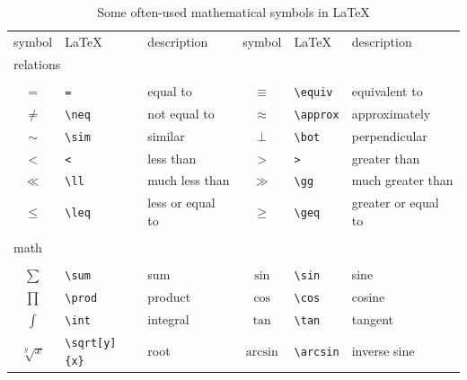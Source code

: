 \label{ch:mathsymbols}

\begin{table}[ht!]\centering\small
\caption{Some often-used mathematical symbols in \LaTeX}\label{tab:mathsymbols}
    \begin{tabular}{cll|cll}
        \toprule
        symbol	        &	 \LaTeX  	        &	 description 	    &	symbol	            &	 \LaTeX  	&	 description\\[+2ex]	
        \multicolumn{2}{l}{relations}			&		                &		                &		                    &		                \\\\
        $=$	            &	\verb|=|	        &	equal to	        &	$\equiv$	        &	\verb|\equiv|	        &	equivalent to	    \\
        $\neq$	        &	\verb|\neq|	        &	not equal to    	&	$\approx$	        &	\verb|\approx|	        &	approximately	    \\
        $\sim$	        &	\verb|\sim|	        &	similar         	&	$\bot$	            &	\verb|\bot|	            &	perpendicular	\\
        $<$	            &	\verb|<|	        &	less than	        &	$>$	                &	\verb|>|	            &	greater than	    \\
        $\ll$	        &	\verb|\ll|	        &	much less than	    &	$\gg$	            &	\verb|\gg|	            &	much greater than	\\
        $\leq$	        &	\verb|\leq|	        &	less or equal to	&	$\geq$	            &	\verb|\geq|	            &	greater or equal to	\\
        \\\multicolumn{2}{l}{math}			    &		                &		                &		                    &		                \\\\
        $\sum$	        &	\verb|\sum|	        &	sum	                &	$\sin$	            &	\verb|\sin|	            &	sine	            \\
        $\prod$	        &	\verb|\prod|	    &	product	            &	$\cos$	            &	\verb|\cos|	            &	cosine	            \\
        $\int$	        &	\verb|\int|	        &	integral	        &	$\tan$	            &	\verb|\tan|	            &	tangent	            \\
        $\sqrt[y]{x}$	    &	\verb|\sqrt[y]{x}|	    & root	        &	$\arcsin$	        &	\verb|\arcsin|	        &	inverse sine	    \\

\end{tabular}
\end{table}
